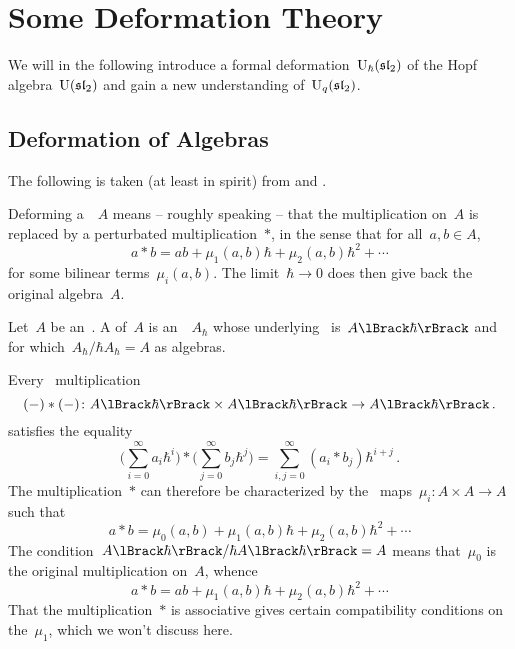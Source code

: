 \documentclass[a4paper, 11pt, oneside]{scrartcl}
\begin{document}
\section{Some Deformation Theory}

We will in the following introduce a formal deformation~$\operatorname{U}_{\hbar}(\mathfrak{sl}_2)$ of the Hopf algebra~$\operatorname{U}(\mathfrak{sl}_2)$ and gain a new understanding of~$\operatorname{U}_q(\mathfrak{sl}_2)$.



\subsection{Deformation of Algebras}

The following is taken (at least in spirit) from \cite[\S 5.2]{pieter_hochschild} and \cite{gerstenhaber_quantum}.

\begin{motivation}
  Deforming a~\algebra{$\kf$}~$A$ means -- roughly speaking -- that the multiplication on~$A$ is replaced by a perturbated multiplication~$*$, in the sense that for all~$a, b \in A$,
  \[
    a * b
    =
    ab + \mu_1(a,b) \hbar + \mu_2(a,b) \hbar^2 + \dotsb
  \]
  for some bilinear terms~$\mu_i(a,b)$.
  The limit~$\hbar \to 0$ does then give back the original algebra~$A$.
\end{motivation}

\begin{definition}
  \label{definition of algebra deformations}
  Let~$A$ be an~\algebra{$\kf$}.
  A  of~$A$ is an~\algebra{$\kfhbar$}~$A_\hbar$ whose underlying~\module{$\kfhbar$} is~$\power{A}{\hbar}$ and for which~$A_\hbar / \hbar A_\hbar = A$ as algebras.
\end{definition}

\begin{remark}
  Every~\bilinear{$\kfhbar$} multiplication
  \[
    (-) * (-)
    \colon
    \power{A}{\hbar} \times \power{A}{\hbar}
    \to
    \power{A}{\hbar} \,.
  \]
  satisfies the equality
  \[
    \Biggl( \sum_{i=0}^\infty a_i \hbar^i \Biggr)
    *
    \Biggl( \sum_{j=0}^\infty b_j \hbar^j \Biggr)
    =
    \sum_{i,j = 0}^\infty (a_i * b_j) \hbar^{i+j} \,.
  \]
  The multiplication~$*$ can therefore be characterized by the~\bilinear{$\kf$} maps~$\mu_i \colon A \times A \to A$ such that
  \[
    a * b
    =
    \mu_0(a, b) + \mu_1(a, b) \hbar + \mu_2(a, b) \hbar^2 + \dotsb
  \]
  The condition~$\power{A}{\hbar} / \hbar \power{A}{\hbar} = A$ means that~$\mu_0$ is the original multiplication on~$A$, whence
  \[
    a * b
    =
    ab + \mu_1(a, b) \hbar + \mu_2(a, b) \hbar^2 + \dotsb
  \]
  That the multiplication~$*$ is associative gives certain compatibility conditions on the~$\mu_1$, which we won’t discuss here.
\end{remark}
\end{document}
